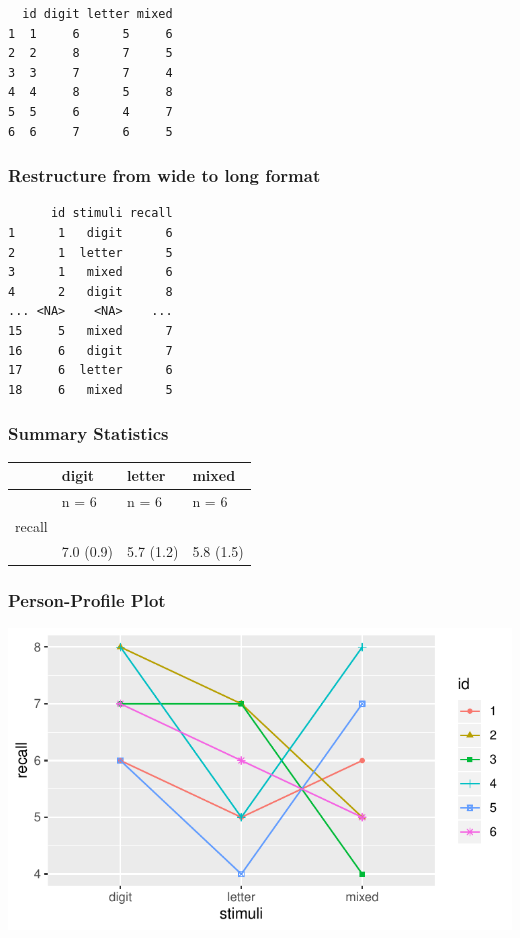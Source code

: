 \documentclass[
]{article}
\begin{document}
\begin{verbatim}
  id digit letter mixed
1  1     6      5     6
2  2     8      7     5
3  3     7      7     4
4  4     8      5     8
5  5     6      4     7
6  6     7      6     5
\end{verbatim}

\hypertarget{restructure-from-wide-to-long-format-4}{%
\subsubsection{Restructure from wide to long
format}\label{restructure-from-wide-to-long-format-4}}

\begin{verbatim}
      id stimuli recall
1      1   digit      6
2      1  letter      5
3      1   mixed      6
4      2   digit      8
... <NA>    <NA>    ...
15     5   mixed      7
16     6   digit      7
17     6  letter      6
18     6   mixed      5
\end{verbatim}

\clearpage

\hypertarget{summary-statistics-2}{%
\subsubsection{Summary Statistics}\label{summary-statistics-2}}

\begin{longtable}[]{@{}llll@{}}
\toprule
& digit & letter & mixed\tabularnewline
\midrule
\endhead
& n = 6 & n = 6 & n = 6\tabularnewline
recall & & &\tabularnewline
& 7.0 (0.9) & 5.7 (1.2) & 5.8 (1.5)\tabularnewline
\bottomrule
\end{longtable}

\hypertarget{person-profile-plot-4}{%
\subsubsection{Person-Profile Plot}\label{person-profile-plot-4}}

\begin{center}\includegraphics{Chapter-15-Assignment-R-Skeleton--2020spring_files/figure-latex/unnamed-chunk-32-1} \end{center}
\end{document}
